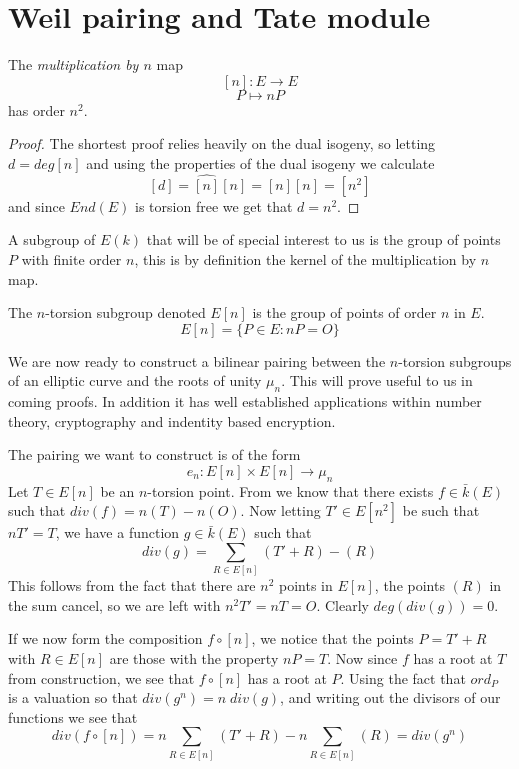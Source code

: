 \section{Weil pairing and Tate module}

\begin{prop}
 The \emph{multiplication by $n$} map
$$ [n] : E \rightarrow E $$
$$ P \mapsto nP $$
has order $n^2$.
\end{prop}
\begin{proof}
The shortest proof relies heavily on the dual isogeny, so letting $d = deg [n]$ and using the properties of 
the dual isogeny we calculate
$$ [d] = \widehat{[n]}[n] = [n][n] = [n^2] $$
and since $End(E)$ is torsion free \cite{AEC} we get that $d = n^2$.
\end{proof}

A subgroup of $E(k)$ that will be of special interest to us is the group of points $P$
with finite order $n$, this is by definition the kernel of the multiplication by $n$ map.
\begin{mydef}
 The $n$-torsion subgroup denoted $E[n]$ is the group of points of order $n$ in $E$.
$$ E[n] = \{ P\in E : nP = O \} $$
\end{mydef}

We are now ready to construct a bilinear pairing between the $n$-torsion subgroups of
an elliptic curve and the roots of unity $\mu_n$. This will prove useful to us in coming
proofs. In addition it has well established applications within number theory, cryptography
and indentity based encryption.

The pairing we want to construct is of the form
$$ e_n : E[n] \times E[n] \rightarrow \mu_n $$
Let $T\in E[n]$ be an $n$-torsion point. From \cite{Lawrence} we know that there exists
$f \in \bar{k}(E)$ such that $div(f) = n(T) - n(O)$. Now letting $T' \in E[n^2]$ be such
that $nT' = T$, we have a function $g \in \bar{k}(E)$ such that
$$ div(g) = \sum_{R\in E[n]} (T'+R)-(R) $$
This follows from the fact that there are $n^2$ points in $E[n]$, the points $(R)$ in the
sum cancel, so we are left with $n^2 T' = nT = O$. Clearly $deg(div(g)) = 0$.

If we now form the composition $f \circ [n]$, we notice that the points $P = T' + R$ with
$R\in E[n]$ are those with the property $nP = T$. Now since $f$ has a root at $T$ from
construction, we see that $f \circ [n]$ has a root at $P$. Using the fact that $ord_P$ is a valuation
so that $div(g^n) = n\;div(g)$, and writing out the divisors of our functions we see that
$$ div(f \circ [n]) = n\sum_{R\in E[n]} (T'+R) - n\sum_{R\in E[n]} (R) = div(g^n) $$

